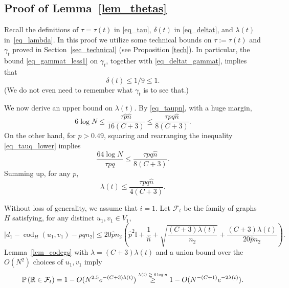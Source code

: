 \documentclass[12pt,reqno]{amsart}
\newcommand{\fc}{{\mathcal{F}}}
\newcommand{\Prob} {\mathbb {P}}
\newcommand{\prob}[1]{\Prob\left(#1\right)}
\newcommand{\R} {\mathbb R}
\newcommand{\I} {\mathbb I}
\newcommand{\cod}{\operatorname{cod}}
\theoremstyle{definition}
\newcommand{\deltat}{\delta(t)}
\newcommand{\By}[2]{\overset{\mbox{\tiny\ensuremath{#1}}}{#2}}
\begin{document}
\subsection{Proof of Lemma~\ref{lem_thetas}}
\label{ss_proof_thetas}
Recall the definitions of $\tau=\tau(t)$ in \eqref{eq_tau}, $\delta(t)$ in \eqref{eq_deltat}, and $\lambda(t)$ in~\eqref{eq_lambda}.
In this proof we utilize some technical bounds on $\tau:=\tau(t)$ and $\gamma_t$ proved in Section~\ref{sec_technical} (see Proposition \ref{tech}).
In particular, the  bound \eqref{eq_gammat_less1} on $\gamma_t$, together with \eqref{eq_deltat_gammat}, implies that
\begin{equation}
	\deltat \le 1/9\le 1.
	\label{eq_delta_upper}
\end{equation}
(We do not even need to remember what $\gamma_t$ is to see that.)

We now derive an upper bound on $\lambda(t)$.
By \eqref{eq_taupn}, with a huge margin,
\[
	6 \log N \le \frac{\tau \hat p \hat n}{16(C + 3)} \le \frac{\tau pq\hat n }{8(C+3)}.
\]
On the other hand, for $p > 0.49$, squaring and rearranging the inequality \eqref{eq_tauq_lower} implies
\begin{equation*}
	\frac{64\log N}{\tau p q} \le
	\frac{\tau pq\hat n }{8(C+3)}.
\end{equation*}
Summing up, for any $p$,
\begin{equation}
  \label{eq_lambda_upper}
\lambda(t)\le \frac{\tau pq \hat n}{4(C + 3)}.
\end{equation}

	
Without loss of generality, we assume that $i = 1$. Let $\fc_t$ be the family of graphs $H$ satisfying, for any distinct $u_1, v_1 \in V_1$,
\begin{equation}
  \label{eq_Sienkiewicz}
	|d_1 - \cod_H(u_1, v_1) - pqn_2|
	\le 20\hat p n_{2} \left(\hat p^2\I + \frac{1}{\hat n}  + \sqrt{\frac{(C+3)\lambda(t)}{n_{2}}} + \frac{(C+3)\lambda(t)}{20\hat pn_2}\right).
\end{equation}
Lemma~\ref{lem_codegs} with $\lambda = (C+3)\lambda(t)$ and a union bound over the $O(N^2)$ choices of $u_1, v_1$ imply
\begin{equation}
	\label{eq_good_codegs}
	\prob{\R \in \fc_t} = 1 - O(N^{2.5} e^{-(C+3)\lambda(t)}) \By{\lambda(t) \ge 6\log n}{\ge} 1 - O(N^{-(C+1)}e^{-2\lambda(t)}).
\end{equation}
\end{document}
